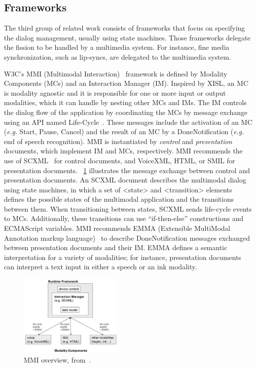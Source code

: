 \documentclass[
  doutorado,
  american
]{ThesisPUC}
\newcommand{\fig}[1]{\figurename~\ref{#1}}
\newcommand{\captionvspace}{\vspace{-1.3em}}
\begin{document}
\subsection{Frameworks}
\label{sec:state:frameworks}

The third group of related work consists of frameworks that focus on specifying
the dialog management, usually using state machines. Those frameworks delegate
the fission to be handled by a multimedia system. For instance, fine media
synchronization, such as lip-syncs, are delegated to the multimedia system.

W3C’s MMI (Multimodal Interaction)~\cite{w3c_multimodal_2003} framework is
defined by Modality Components (MCs) and an Interaction Manager (IM). Inspired
by XISL, an MC is modality agnostic and it is responsible for one or more input
or output modalities, which it can handle by nesting other MCs and IMs. The IM
controls the dialog flow of the application by coordinating the MCs by message
exchange using an API named Life-Cycle~\cite{w3c_multimodal_2012}. These
messages include the activation of an MC (\textit{e.g.} Start, Pause, Cancel) and the
result of an MC by a DoneNotification (\textit{e.g.} end of speech recognition). MMI is
instantiated by \textit{control} and 
\textit{presentation} documents, which implement IM and MCs, respectively. MMI
recommends the use of SCXML~\cite{w3c_state_2012} for control documents, and
VoiceXML, HTML, or SMIL for presentation documents. \fig{fig:mmi} illustrates
the message exchange between control and presentation documents. An SCXML
document describes the multimodal dialog using state machines, in which a set of
<state> and <transition> elements defines the possible states of the multimodal
application and the transitions between them. When transitioning between states,
SCXML sends life-cycle events to MCs. Additionally, these transitions can use
“if-then-else” constructions and ECMAScript variables. MMI recommends EMMA
(Extensible MultiModal Annotation markup language)~\cite{w3c_emma:_2009} to
describe DoneNotification messages exchanged between presentation documents and
their IM. EMMA defines a semantic interpretation for a variety of modalities;
for instance, presentation documents can interpret a text input in either a
speech or an ink modality.

\begin{figure}[!ht]
\begin{center}
	\includegraphics[width=5cm, keepaspectratio]{img/img7.png}
	\caption[MMI overview]{MMI overview, from~\cite{dahl_standards_2009}.}
	\label{fig:mmi}
	\captionvspace
\end{center}
\end{figure}
\end{document}
